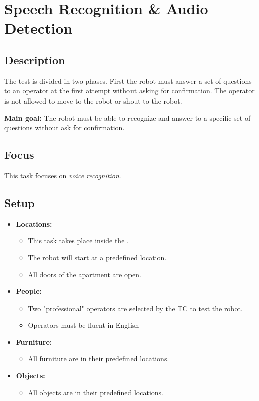 \section{Speech Recognition \& Audio Detection}
\label{test:speech-recognition-audio-detection}

\subsection*{Description}
The test is divided in two phases. First the robot must answer a set of questions to an operator at the first attempt without asking for confirmation. The operator is not allowed to move to the robot or shout to the robot.

\noindent \textbf{Main goal:}
The robot must be able to recognize and answer to a specific set of questions without ask for confirmation.


\subsection*{Focus}
This task focuses on
\textit{voice recognition}.

\subsection*{Setup}
\begin{itemize}[nosep]	
	\item \textbf{Locations:} 
	\begin{itemize}
		\item This task takes place inside the \Arena{}.
		\item The robot will start at a predefined location.
		\item All doors of the apartment are open.
	\end{itemize}	 
	\item \textbf{People:} 
	\begin{itemize}
		\item Two "professional" operators are selected by the TC to test the robot.
		\item Operators must be fluent in English
	\end{itemize}
	\item \textbf{Furniture:} 
	\begin{itemize}
		\item All furniture are in their predefined locations.
	\end{itemize}
    \item \textbf{Objects:} 
    \begin{itemize}
		\item All objects are in their predefined locations.
	\end{itemize}
\end{itemize}

